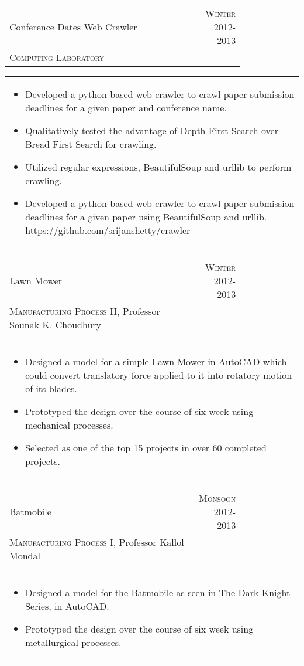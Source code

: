 \documentclass[a4paper,10pt]{article} %
\newcommand{\lproject}[4]{
    \begin{tabular}{p{0.80\linewidth}r}
        \textcolor{NavyBlue}{#2} & \multicolumn{1}{m{4cm}}{\raggedleft \textsc{#1}}\\
        #3
    \end{tabular}
    \begin{tabular}{p{\linewidth}}
    \vspace{-0.3cm}
        \footnotesize{#4}
    \end{tabular}
    \vspace{-0.5cm}
}
\begin{document}
\lproject {Winter 2012-2013}
          {Conference Dates Web Crawler}
          {\textsc{Computing Laboratory}}
          {
              \begin{itemize}[leftmargin=0.5cm]
                   \item Developed a python based web crawler to crawl paper submission deadlines for a given paper and conference name.
                   \item Qualitatively tested the advantage of Depth First Search over Bread First Search for crawling.
                   \item Utilized regular expressions, BeautifulSoup and urllib to perform crawling.
                   \item Developed a python based web crawler to crawl paper submission deadlines for a given paper using BeautifulSoup and
                       urllib.
                   \href{https://github.com/srijanshetty/crawler} {https://github.com/srijanshetty/crawler}
              \end{itemize}

          }

\lproject {Winter 2012-2013}
          {Lawn Mower}
          {\textsc{Manufacturing Process II}, Professor Sounak K. Choudhury}
          {
               \begin{itemize}[leftmargin=0.5cm]
                   \item Designed a model for a simple Lawn Mower in AutoCAD which could convert translatory force applied to it
                       into rotatory motion of its blades.
                   \item Prototyped the design over the course of six week using mechanical processes.
                   \item Selected as one of the top 15 projects in over 60 completed projects.
               \end{itemize}
           }


\lproject {Monsoon 2012-2013}
          {Batmobile}
          {\textsc{Manufacturing Process I}, Professor Kallol Mondal}
          {
               \begin{itemize}[leftmargin=0.5cm]
                   \item Designed a model for the Batmobile as seen in The Dark Knight Series, in AutoCAD.
                   \item Prototyped the design over the course of six week using metallurgical processes.
               \end{itemize}
           }
\end{document}
